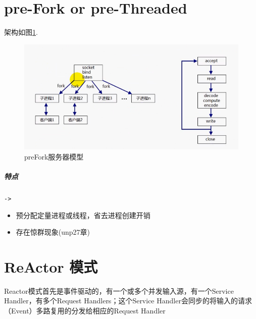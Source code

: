 \documentclass[UTF8,a4paper,12pt]{ctexbook}
\begin{document}
	\newpage	
	\section{pre-Fork or pre-Threaded}
		架构如图\ref{preFork}.
		
		\begin{figure}[htbp]
			\centering
			\includegraphics[scale = 0.6]{figures/preFork.png}
			\caption{preFork服务器模型}
			\label{preFork}
		\end{figure}
		
		\subparagraph{特点}\verb|->|
			\begin{itemize}[itemindent = 1em]
				\item 预分配定量进程或线程，省去进程创建开销
				\item 存在惊群现象(unp27章)
			\end{itemize}
	

	\newpage
	\section{ReActor  模式}
		Reactor模式首先是事件驱动的，有一个或多个并发输入源，有一个Service Handler，有多个Request Handlers；这个Service Handler会同步的将输入的请求（Event）多路复用的分发给相应的Request Handler 
	
\end{document}
